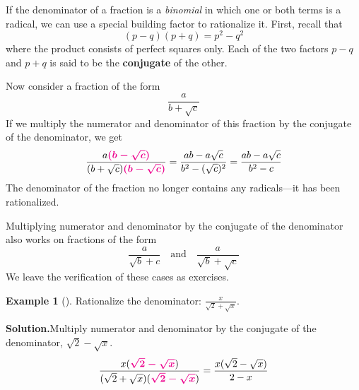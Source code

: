 \documentclass[10pt,]{book}
\newcommand{\terminology}[1]{\textbf{#1}}
\theoremstyle{plain}
\theoremstyle{definition}
\theoremstyle{definition}
\newtheorem{example}[theorem]{Example}
\theoremstyle{definition}
\numberwithin{equation}{part}
\newcommand{\alert}[1]{\boldsymbol{\color{magenta}{#1}}}
\begin{document}
\par
If the denominator of a fraction is a \emph{binomial} in which one or both terms is a radical, we can use a special building factor to rationalize it. First, recall that%
\begin{equation*}
(p − q) (p + q) = p^2 − q^2
\end{equation*}
where the product consists of perfect squares only. Each of the two factors \(p − q\) and \(p + q\) is said to be the \terminology{conjugate} of the other.%
\par
Now consider a fraction of the form%
\begin{equation*}
\frac{a}{b+\sqrt{c}}
\end{equation*}
If we multiply the numerator and denominator of this fraction by the conjugate of the denominator, we get%
\begin{equation*}
\frac{a \alert{(b-\sqrt{c})}}{(b+\sqrt{c})\alert{(b-\sqrt{c})}}=\frac{ab-a\sqrt{c}}{b^2-(\sqrt{c})^2}
=\frac{ab-a\sqrt{c}}{b^2-c}
\end{equation*}
The denominator of the fraction no longer contains any radicals—it has been rationalized.%
\par
Multiplying numerator and denominator by the conjugate of the denominator also works on fractions of the form%
\begin{equation*}
\frac{a}{\sqrt{b}+c} ~~~\text{ and }~~~\frac{a}{\sqrt{b}+\sqrt{c}} 
\end{equation*}
We leave the verification of these cases as exercises.%
\begin{example}[]\label{example-76}
Rationalize the denominator: \(\displaystyle{\frac{x}{\sqrt{2}+\sqrt{x}}} \).%
\par\medskip\noindent%
\textbf{Solution.}\quad Multiply numerator and denominator by the conjugate of the denominator, \(\sqrt{2}-\sqrt{x} \).%
\begin{equation*}
\frac{x (\alert{\sqrt{2}-\sqrt{x}}) }{(\sqrt{2}+\sqrt{x})(\alert{\sqrt{2}-\sqrt{x}} )}
=\frac{x(\sqrt{2}-\sqrt{x})}{2-x}
\end{equation*}
%
\end{example}
\typeout{************************************************}
\typeout{************************************************}
\end{document}
